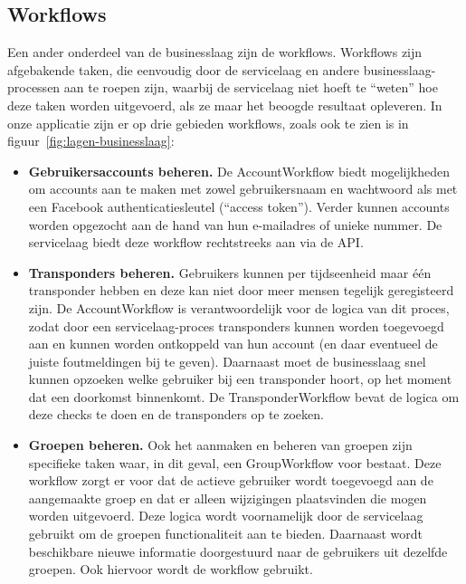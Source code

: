 \subsection{Workflows}

Een ander onderdeel van de businesslaag zijn de workflows. Workflows zijn afgebakende taken, 
die eenvoudig door de servicelaag en andere businesslaag-processen aan te roepen zijn, waarbij de servicelaag niet hoeft te ``weten'' hoe deze taken worden uitgevoerd, als ze maar het beoogde resultaat opleveren. In onze applicatie zijn er op drie gebieden workflows, zoals ook te zien is in figuur~\ref{fig:lagen-businesslaag}:

\begin{itemize}
	\item{\textbf{Gebruikersaccounts beheren.}} 
	De AccountWorkflow biedt mogelijkheden om accounts aan te maken met zowel gebruikersnaam en wachtwoord als met een Facebook authenticatiesleutel (``access token''). Verder kunnen accounts worden opgezocht aan de hand van hun e-mailadres of unieke nummer. De servicelaag biedt deze workflow rechtstreeks aan via de API.

	\item{\textbf{Transponders beheren.}} 
	Gebruikers kunnen per tijdseenheid maar één transponder hebben en deze kan niet door meer mensen tegelijk geregisteerd zijn. De AccountWorkflow is verantwoordelijk voor de logica van dit proces, zodat door een servicelaag-proces transponders kunnen worden toegevoegd aan en kunnen worden ontkoppeld van hun account (en daar eventueel de juiste foutmeldingen bij te geven). Daarnaast moet de businesslaag snel kunnen opzoeken welke gebruiker bij een transponder hoort, op het moment dat een doorkomst binnenkomt. De TransponderWorkflow bevat de logica om deze checks te doen en de transponders op te zoeken.

	\item{\textbf{Groepen beheren.}} 
	Ook het aanmaken en beheren van groepen zijn specifieke taken waar, in dit geval, een GroupWorkflow voor bestaat. Deze workflow zorgt er voor dat de actieve gebruiker wordt toegevoegd aan de aangemaakte groep en dat er alleen wijzigingen plaatsvinden die mogen worden uitgevoerd. Deze logica wordt voornamelijk door de servicelaag gebruikt om de groepen functionaliteit aan te bieden. Daarnaast wordt beschikbare nieuwe informatie doorgestuurd naar de gebruikers uit dezelfde groepen. Ook hiervoor wordt de workflow gebruikt.

\end{itemize}